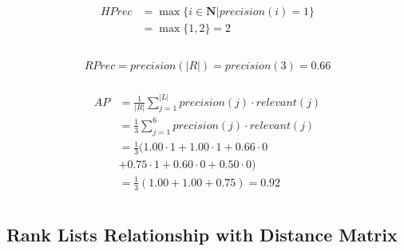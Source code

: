 \begin{example}
  \vspace{0.5cm}

  \begin{subexample}{\linewidth}
    \begin{gather*}
      \begin{split}
        HPrec &= \max\{i \in \mathbf{N} | precision(i) = 1\} \\
              &= \max\{1, 2\} = 2 \\
      \end{split}
    \end{gather*}
  \end{subexample}

  \vspace{0.5cm}

  \begin{subexample}{\linewidth}
    \begin{gather*}
      \begin{split}
        RPrec = precision(|R|) = precision(3) = 0.66
      \end{split}
    \end{gather*}
  \end{subexample}

  \vspace{0.5cm}

  \begin{subexample}{\linewidth}
    \begin{gather*}
      \begin{split}
        AP &= \frac{1}{|R|} \sum_{j=1}^{|L|} precision(j) \cdot relevant(j) \\
           &= \frac{1}{3} \sum_{j=1}^{6} precision(j) \cdot relevant(j) \\
           &= \frac{1}{3} ( 1.00 \cdot 1 + 1.00 \cdot 1 + 0.66 \cdot 0 \\
           &+ 0.75 \cdot 1 + 0.60 \cdot 0 + 0.50 \cdot 0) \\
           &= \frac{1}{3} (1.00 + 1.00 + 0.75) = 0.92 \\
      \end{split}
    \end{gather*}
  \end{subexample}

\end{example}

\subsection{Rank Lists Relationship with Distance Matrix \label{sec:distances_matrix}}

